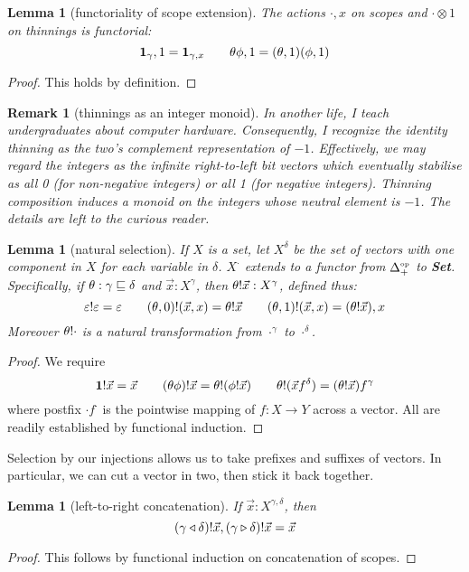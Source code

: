 \documentclass{jfp1}
\newtheorem{lemma}[theorem]{Lemma}
\newtheorem{remark}[theorem]{Remark}
\newcommand{\emp}{\varepsilon}
\newcommand{\Set}{\textbf{Set}}
\newcommand{\op}[1]{#1^{\mbox{\tiny op}}}
\begin{document}
\begin{lemma}[functoriality of scope extension]
  The actions $\cdot,x$ on scopes and $\cdot\otimes1$ on thinnings is functorial:
  \[
    \mathbf{1}_\gamma,1 = \mathbf{1}_{\gamma,x}\qquad \theta\phi,1 = (\theta,1)(\phi,1)
    \]
\end{lemma}
\begin{proof}
  This holds by definition.
\end{proof}

\begin{remark}[thinnings as an integer monoid]
  In another life, I teach undergraduates about computer hardware. Consequently, I recognize the identity thinning as the two's complement representation of $-1$.
  Effectively, we may regard the integers as the infinite right-to-left bit vectors which eventually stabilise as all 0 (for non-negative integers) or all 1 (for negative integers). Thinning composition induces a monoid on the integers whose neutral element is $-1$. The details are left to the curious reader.
\end{remark}

\begin{lemma}[natural selection]
  If $X$ is a set, let $X^\delta$ be the set of vectors with one
  component in $X$ for each variable in $\delta$. $X^\cdot$ extends
  to a functor from $\op{\Delta_+}$ to \Set.
  Specifically, if $\theta:\gamma\sqsubseteq\delta$ and $\vec x:X^\gamma$,
  then $\theta!\vec x : X^\gamma$, defined thus:
  \[
    \sel\emp\emp=\emp \qquad
    \sel{(\theta,0)}{(\vec x,x)} = \sel\theta{\vec x} \qquad
    \sel{(\theta,1)}{(\vec x,x)} = (\sel\theta{\vec x}),x
  \]
  Moreover $\theta!\cdot$ is a natural transformation from
  $\cdot^\gamma$ to $\cdot^\delta$.
\end{lemma}
\begin{proof}
  We require
  \[
    \mathbf{1}!\vec x = \vec x \qquad
    (\theta\phi)!\vec x = \theta!(\phi!\vec x) \qquad
    \theta!(\vec x f^\delta) = (\theta!\vec x)f^\gamma
  \]
  where postfix $\cdot f^\cdot$ is the pointwise mapping of $f:X\to Y$ across a vector.
  All are readily established by functional induction.
\end{proof}

Selection by our injections allows us to take prefixes and suffixes of
vectors. In particular, we can cut a vector in two, then stick it back
together.

\begin{lemma}[left-to-right concatenation]
  If $\vec x : X^{\gamma,\delta}$, then
  \[
    (\gamma \triangleleft \delta)!\vec x, (\gamma \triangleright \delta)!\vec x
    = \vec x
  \]
\end{lemma}
\begin{proof}
  This follows by functional induction on concatenation of scopes.
\end{proof}
\end{document}

